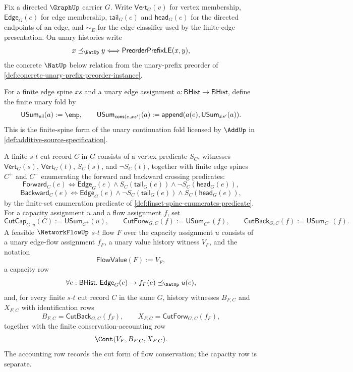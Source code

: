 \begin{definition}
\label{def:networkflow-finite-flow-cut-data}
Fix a directed $\GraphUp$ carrier $G$. Write $\mathsf{Vert}_G(v)$ for vertex membership, $\mathsf{Edge}_G(e)$ for edge membership, $\mathsf{tail}_G(e)$ and $\mathsf{head}_G(e)$ for the directed endpoints of an edge, and $\sim_E$ for the edge classifier used by the finite-edge presentation. On unary histories write
$$
x\preceq_{\NatUp}y
\Longleftrightarrow
\mathsf{PreorderPrefixLE}(x,y),
$$
the concrete $\NatUp$ below relation from the unary-prefix preorder of \autoref{def:concrete-unary-prefix-preorder-instance}.

For a finite edge spine $xs$ and a unary edge assignment $a:\mathsf{BHist}\to\mathsf{BHist}$, define the finite unary fold by
$$
\mathsf{USum}_{\mathsf{nil}}(a):=\emp,
\qquad
\mathsf{USum}_{\mathsf{cons}(e,xs')}(a):=
\mathsf{append}(a(e),\mathsf{USum}_{xs'}(a)).
$$
This is the finite-spine form of the unary continuation fold licensed by $\AddUp$ in \autoref{def:additive-source-specification}.

A finite $s$-$t$ cut record $C$ in $G$ consists of a vertex predicate $S_C$, witnesses $\mathsf{Vert}_G(s)$, $\mathsf{Vert}_G(t)$, $S_C(s)$, and $\neg S_C(t)$, together with finite edge spines $C^{+}$ and $C^{-}$ enumerating the forward and backward crossing predicates:
$$
\mathsf{Forward}_C(e)
\Longleftrightarrow
\mathsf{Edge}_G(e)\land S_C(\mathsf{tail}_G(e))\land \neg S_C(\mathsf{head}_G(e)),
$$
$$
\mathsf{Backward}_C(e)
\Longleftrightarrow
\mathsf{Edge}_G(e)\land \neg S_C(\mathsf{tail}_G(e))\land S_C(\mathsf{head}_G(e)),
$$
by the finite-set enumeration predicate of \autoref{def:finset-spine-enumerates-predicate}. For a capacity assignment $u$ and a flow assignment $f$, set
$$
\mathsf{CutCap}_{G,u}(C):=\mathsf{USum}_{C^{+}}(u),
\qquad
\mathsf{CutForw}_{G,C}(f):=\mathsf{USum}_{C^{+}}(f),
\qquad
\mathsf{CutBack}_{G,C}(f):=\mathsf{USum}_{C^{-}}(f).
$$
A feasible $\NetworkFlowUp$ $s$-$t$ flow $F$ over the capacity assignment $u$ consists of a unary edge-flow assignment $f_F$, a unary value history witness $V_F$, and the notation
$$
\mathsf{FlowValue}(F):=V_F,
$$
a capacity row
$$
\forall e:\mathsf{BHist}.\;\mathsf{Edge}_G(e)\to f_F(e)\preceq_{\NatUp}u(e),
$$
and, for every finite $s$-$t$ cut record $C$ in the same $G$, history witnesses $B_{F,C}$ and $X_{F,C}$ with identification rows
$$
B_{F,C}=\mathsf{CutBack}_{G,C}(f_F),
\qquad
X_{F,C}=\mathsf{CutForw}_{G,C}(f_F),
$$
together with the finite conservation-accounting row
$$
\Cont(V_F,B_{F,C},X_{F,C}).
$$
The accounting row records the cut form of flow conservation; the capacity row is separate.
\end{definition}

